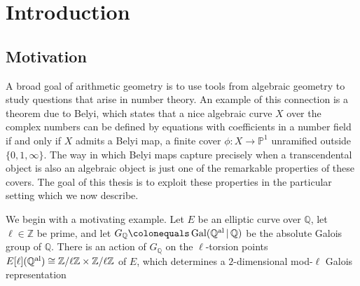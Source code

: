 \documentclass{dcthesis}
\newcommand{\PP}{\mathbb P}
\newcommand{\QQ}{\mathbb Q}
\newcommand{\ZZ}{\mathbb Z}
\newcommand{\defi}[1]{\textsf{#1}}
\newcommand{\QQal}{{\mathbb Q}^{\textup{al}}}
\DeclareMathOperator{\Gal}{Gal}
\numberwithin{equation}{section}
\theoremstyle{definition}
\theoremstyle{remark}
\begin{document}
\tableofcontents


\listoffigures

\mainmatter


\chapter{Introduction}{\label{chapter:intro}
  \section{Motivation}{\label{sec:motivation}{
    A broad goal of arithmetic geometry is
    to use tools from algebraic geometry
    to study questions that arise
    in number theory.
    An example of this connection
    is a theorem due to Belyi,
    which states that a nice algebraic curve
    $X$
    over the complex numbers
    can be defined by equations with
    coefficients in a number field
    if and only if
    $X$ admits a \defi{Belyi map},
    a finite cover $\phi\colon X\to\PP^1$
    unramified outside
    $\{0,1,\infty\}$.
    The way in which Belyi maps
    capture precisely when a transcendental
    object is also an algebraic object
    is just one of the remarkable properties
    of these covers.
    The goal of this thesis is to exploit
    these properties in the
    particular setting which we
    now describe.
    \par
    We begin with a motivating example.
    Let $E$ be an elliptic curve over $\QQ$,
    let $\ell\in\ZZ$ be prime,
    and let $G_\QQ\colonequals\Gal(\QQal\,|\,\QQ)$
    be the absolute Galois group of $\QQ$.
    There is an action of $G_\QQ$ on the
    $\ell$-torsion points
    $E[\ell](\QQal)\cong\ZZ/\ell\ZZ\times
    \ZZ/\ell\ZZ$
    of $E$,
    which determines a $2$-dimensional
    mod-$\ell$ Galois representation
}}}
\end{document}
